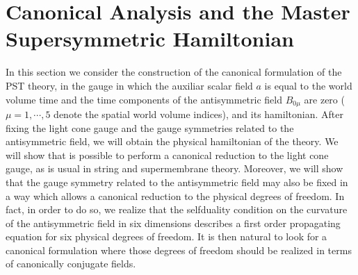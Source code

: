 \documentclass[a4paper,12pt]{article}
\begin{document}
\section{Canonical Analysis and the Master Supersymmetric Hamiltonian}
In this section we consider the construction of the canonical
formulation of the PST theory, in the gauge in which the auxiliar
scalar field $a$ is equal to the world volume time and the time
components of the antisymmetric field $B_{0\mu}$ are zero
($\mu=1,\cdots, 5$ denote the spatial world volume indices), and
its hamiltonian. After fixing the light cone gauge and the gauge
symmetries related to the antisymmetric field, we will obtain the
physical hamiltonian of the theory. We will show that is possible
to perform a canonical reduction to the light cone gauge, as is
usual in string and supermembrane theory. Moreover, we will show
that the gauge symmetry related to the antisymmetric field may
also be fixed in a way which allows a canonical reduction to the
physical degrees of freedom. In fact, in order to do so, we
realize that the selfduality condition on the curvature of the
antisymmetric field in six dimensions describes a first order
propagating equation for six physical degrees of freedom. It is
then natural to look for a canonical formulation where those
degrees of freedom should be realized in terms of canonically
conjugate fields.
\end{document}
